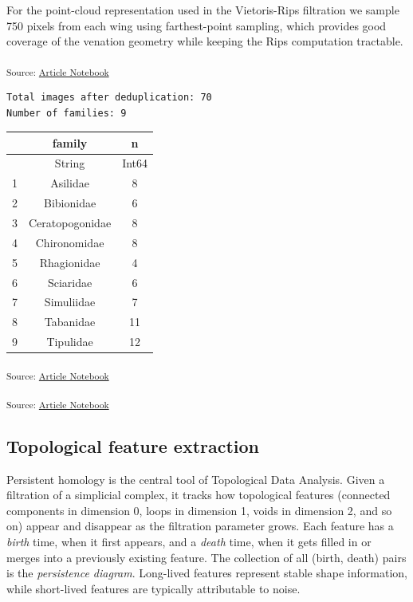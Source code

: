 \documentclass[
  a4paper,
  DIV=11,
  numbers=noendperiod]{scrartcl}
\begin{document}
For the point-cloud representation used in the Vietoris-Rips filtration
we sample 750 pixels from each wing using farthest-point sampling, which
provides good coverage of the venation geometry while keeping the Rips
computation tractable.

\textsubscript{Source:
\href{https://JuliaTDA.github.io/tda-fly/index.qmd.html}{Article
Notebook}}

\begin{verbatim}
Total images after deduplication: 70
Number of families: 9
\end{verbatim}

\begin{tabular}{r|cc}
    & family & n\\
    \hline
    & String & Int64\\
    \hline
    1 & Asilidae & 8 \\
    2 & Bibionidae & 6 \\
    3 & Ceratopogonidae & 8 \\
    4 & Chironomidae & 8 \\
    5 & Rhagionidae & 4 \\
    6 & Sciaridae & 6 \\
    7 & Simuliidae & 7 \\
    8 & Tabanidae & 11 \\
    9 & Tipulidae & 12 \\
\end{tabular}

\textsubscript{Source:
\href{https://JuliaTDA.github.io/tda-fly/index.qmd.html}{Article
Notebook}}

\textsubscript{Source:
\href{https://JuliaTDA.github.io/tda-fly/index.qmd.html}{Article
Notebook}}

\subsection{Topological feature
extraction}\label{topological-feature-extraction}

Persistent homology is the central tool of Topological Data Analysis.
Given a filtration of a simplicial complex, it tracks how topological
features (connected components in dimension 0, loops in dimension 1,
voids in dimension 2, and so on) appear and disappear as the filtration
parameter grows. Each feature has a \emph{birth} time, when it first
appears, and a \emph{death} time, when it gets filled in or merges into
a previously existing feature. The collection of all (birth, death)
pairs is the \emph{persistence diagram}. Long-lived features represent
stable shape information, while short-lived features are typically
attributable to noise.
\end{document}
